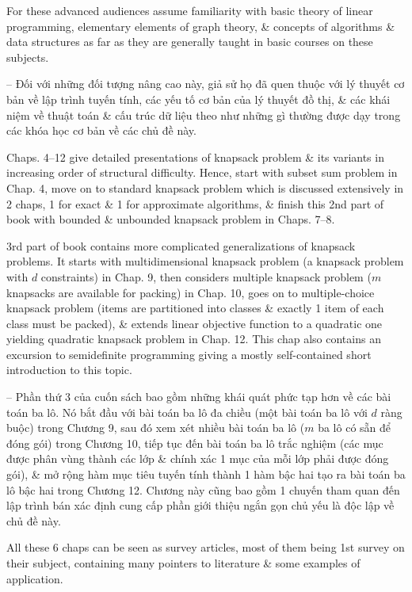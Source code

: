 \documentclass{article}
\begin{document}
\begin{itemize}
    For these advanced audiences assume familiarity with basic theory of linear programming, elementary elements of graph theory, \& concepts of algorithms \& data structures as far as they are generally taught in basic courses on these subjects.
    
    -- Đối với những đối tượng nâng cao này, giả sử họ đã quen thuộc với lý thuyết cơ bản về lập trình tuyến tính, các yếu tố cơ bản của lý thuyết đồ thị, \& các khái niệm về thuật toán \& cấu trúc dữ liệu theo như những gì thường được dạy trong các khóa học cơ bản về các chủ đề này.
    
    Chaps. 4--12 give detailed presentations of knapsack problem \& its variants in increasing order of structural difficulty. Hence, start with subset sum problem in Chap. 4, move on to standard knapsack problem which is discussed extensively in 2 chaps, 1 for exact \& 1 for approximate algorithms, \& finish this 2nd part of book with bounded \& unbounded knapsack problem in Chaps. 7--8.
    
    3rd part of book contains more complicated generalizations of knapsack problems. It starts with multidimensional knapsack problem (a knapsack problem with $d$ constraints) in Chap. 9, then considers multiple knapsack problem ($m$ knapsacks are available for packing) in Chap. 10, goes on to multiple-choice knapsack problem (items are partitioned into classes \& exactly 1 item of each class must be packed), \& extends linear objective function to a quadratic one yielding quadratic knapsack problem in Chap. 12. This chap also contains an excursion to semidefinite programming giving a mostly self-contained short introduction to this topic.
    
    -- Phần thứ 3 của cuốn sách bao gồm những khái quát phức tạp hơn về các bài toán ba lô. Nó bắt đầu với bài toán ba lô đa chiều (một bài toán ba lô với $d$ ràng buộc) trong Chương 9, sau đó xem xét nhiều bài toán ba lô ($m$ ba lô có sẵn để đóng gói) trong Chương 10, tiếp tục đến bài toán ba lô trắc nghiệm (các mục được phân vùng thành các lớp \& chính xác 1 mục của mỗi lớp phải được đóng gói), \& mở rộng hàm mục tiêu tuyến tính thành 1 hàm bậc hai tạo ra bài toán ba lô bậc hai trong Chương 12. Chương này cũng bao gồm 1 chuyến tham quan đến lập trình bán xác định cung cấp phần giới thiệu ngắn gọn chủ yếu là độc lập về chủ đề này.
    
    All these 6 chaps can be seen as survey articles, most of them being 1st survey on their subject, containing many pointers to literature \& some examples of application.
    

\end{itemize}
\end{document}
